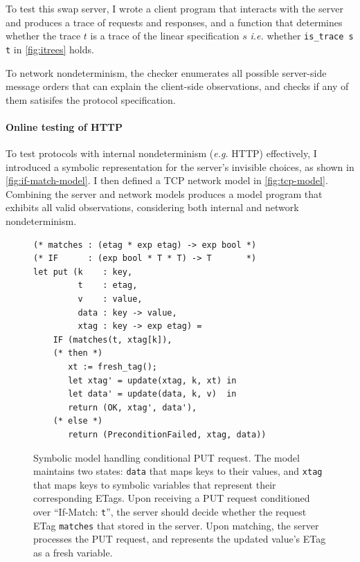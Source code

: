 \documentclass{article}
\newcommand{\ilc}[1]{\lstinline[style=customcoq]{#1}}
\theoremstyle{definition}
\begin{document}
To test this swap server, I wrote a client program that interacts with the
server and produces a trace of requests and responses, and a function that
determines whether the trace $t$ is a trace of the linear specification $s$ {\it
  i.e.} whether \ilc{is_trace s t} in \autoref{fig:itrees} holds.

To network nondeterminism, the checker enumerates all possible server-side
message orders that can explain the client-side observations, and checks if any
of them satisifes the protocol specification.

\paragraph{Online testing of HTTP}
To test protocols with internal nondeterminism ({\it e.g.} HTTP) effectively, I
introduced a symbolic representation for the server's invisible choices, as
shown in \autoref{fig:if-match-model}.  I then defined a TCP network model in
\autoref{fig:tcp-model}.  Combining the server and network models produces a
model program that exhibits all valid observations, considering both internal
and network nondeterminism.

\begin{figure}
\begin{lstlisting}[style=customcoq]
(* matches : (etag * exp etag) -> exp bool *)
(* IF      : (exp bool * T * T) -> T       *)
let put (k    : key,
         t    : etag,
         v    : value,
         data : key -> value,
         xtag : key -> exp etag) =
    IF (matches(t, xtag[k]),
    (* then *)
       xt := fresh_tag();
       let xtag' = update(xtag, k, xt) in
       let data' = update(data, k, v)  in
       return (OK, xtag', data'),
    (* else *)
       return (PreconditionFailed, xtag, data))
\end{lstlisting}
\caption{Symbolic model handling conditional PUT request.  The model maintains
  two states: \ilc{data} that maps keys to their values, and \ilc{xtag} that
  maps keys to symbolic variables that represent their corresponding ETags.
  Upon receiving a PUT request conditioned over ``If-Match: \ilc{t}'', the
  server should decide whether the request ETag \ilc{matches} that stored in the
  server.  Upon matching, the server processes the PUT request, and represents
  the updated value's ETag as a fresh variable.
}
\label{fig:if-match-model}
\end{figure}
\end{document}
